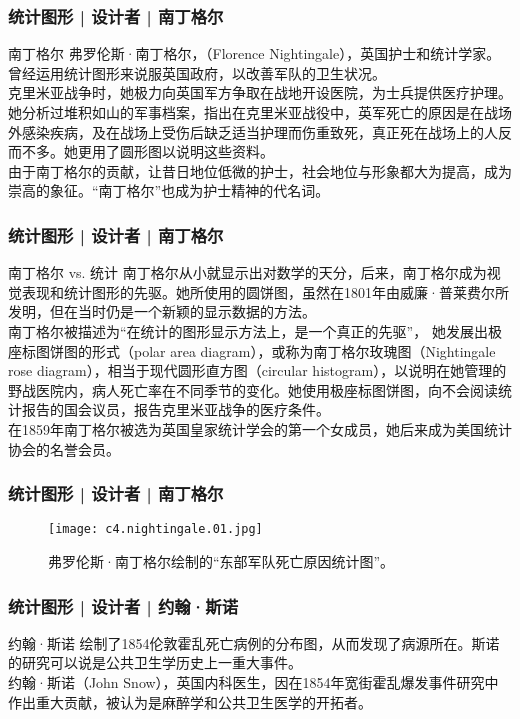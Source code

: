 \begin{frame}
  \frametitle{统计图形 | 设计者 | 南丁格尔}
  \begin{block}{南丁格尔}
    弗罗伦斯·南丁格尔，（Florence Nightingale），英国护士和统计学家。曾经运用统计图形来说服英国政府，以改善军队的卫生状况。\\
    \vspace{0.5em}
克里米亚战争时，她极力向英国军方争取在战地开设医院，为士兵提供医疗护理。她分析过堆积如山的军事档案，指出在克里米亚战役中，英军死亡的原因是在战场外感染疾病，及在战场上受伤后缺乏适当护理而伤重致死，真正死在战场上的人反而不多。她更用了圆形图以说明这些资料。\\
    \vspace{0.5em}
由于南丁格尔的贡献，让昔日地位低微的护士，社会地位与形象都大为提高，成为崇高的象征。“南丁格尔”也成为护士精神的代名词。
  \end{block}
\end{frame}

\begin{frame}
  \frametitle{统计图形 | 设计者 | 南丁格尔}
  \begin{block}{南丁格尔 vs. 统计}
南丁格尔从小就显示出对数学的天分，后来，南丁格尔成为视觉表现和统计图形的先驱。她所使用的圆饼图，虽然在1801年由威廉·普莱费尔所发明，但在当时仍是一个新颖的显示数据的方法。\\
\vspace{0.5em}
南丁格尔被描述为“在统计的图形显示方法上，是一个真正的先驱”， 她发展出极座标图饼图的形式（polar area diagram），或称为南丁格尔玫瑰图（Nightingale rose diagram），相当于现代圆形直方图（circular histogram），以说明在她管理的野战医院内，病人死亡率在不同季节的变化。她使用极座标图饼图，向不会阅读统计报告的国会议员，报告克里米亚战争的医疗条件。\\
\vspace{0.5em}
在1859年南丁格尔被选为英国皇家统计学会的第一个女成员，她后来成为美国统计协会的名誉会员。
  \end{block}
\end{frame}

\begin{frame}
  \frametitle{统计图形 | 设计者 | 南丁格尔}
  \begin{figure}
    \centering
    \texttt{[image: c4.nightingale.01.jpg]}
    \caption{弗罗伦斯·南丁格尔绘制的“东部军队死亡原因统计图”。}
  \end{figure}
\end{frame}

\begin{frame}
  \frametitle{统计图形 | 设计者 | 约翰·斯诺}
  \begin{block}{约翰·斯诺}
    绘制了1854伦敦霍乱死亡病例的分布图，从而发现了病源所在。斯诺的研究可以说是公共卫生学历史上一重大事件。\\
    \vspace{0.5em}
    约翰·斯诺（John Snow），英国内科医生，因在1854年宽街霍乱爆发事件研究中作出重大贡献，被认为是麻醉学和公共卫生医学的开拓者。\\
  \end{block}
\end{frame}

